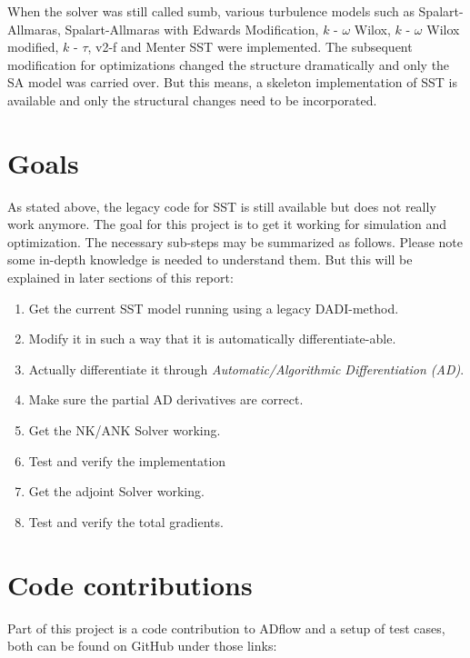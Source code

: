 When the solver was still called sumb, various turbulence models such as
Spalart-Allmaras, Spalart-Allmaras with Edwards Modification, $k$ - $\omega$
Wilox, $k$ - $\omega$ Wilox modified, $k$ - $\tau$, v2-f and Menter SST were
implemented. The subsequent modification for optimizations changed the
structure dramatically and only the SA model was carried over. But this means,
a skeleton implementation of SST is available and only the structural changes
need to be incorporated.


\section{Goals}
As stated above, the legacy code for SST is still available but does not really
work anymore. The goal for this project is to get it working for simulation and
optimization. The necessary sub-steps may be summarized as follows. Please note
some in-depth knowledge is needed to understand them. But this will be
explained in later sections of this report:

\begin{enumerate}
    \item Get the current SST model running using a legacy DADI-method.

    \item Modify it in such a way that it is automatically differentiate-able.

    \item Actually differentiate it through \textit{Automatic/Algorithmic
        Differentiation (AD)}.

    \item Make sure the partial AD derivatives are correct. 

    \item Get the NK/ANK Solver working.

    \item Test and verify the implementation

    \item Get the adjoint Solver working.

    \item Test and verify the total gradients.
\end{enumerate}








\section{Code contributions}
Part of this project is a code contribution to ADflow and a setup of test
cases, both can be found on GitHub under those links:\\

